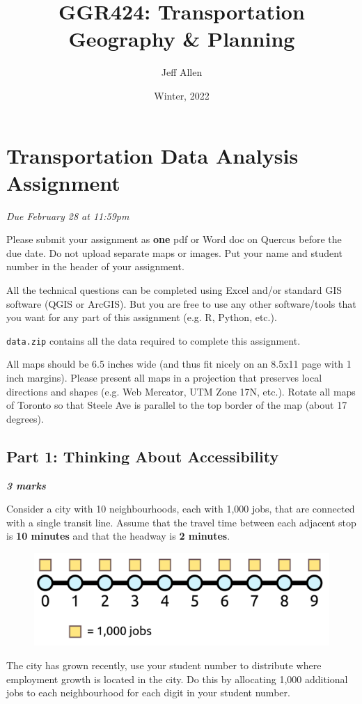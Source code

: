 \documentclass[11pt]{article}
\title{\textbf{GGR424: Transportation Geography \& Planning}}
\author{Jeff Allen}
\date{Winter, 2022}
\begin{document}
	\allsectionsfont{\sffamily}
	
	\section*{Transportation Data Analysis Assignment} 
		
	\textit{Due February 28 at 11:59pm}
	
	Please submit your assignment as \textbf{one} pdf or Word doc on Quercus before the due date. Do not upload separate maps or images. Put your name and student number in the header of your assignment.
	
	All the technical questions can be completed using Excel and/or standard GIS software (QGIS or ArcGIS). But you are free to use any other software/tools that you want for any part of this assignment (e.g. R, Python, etc.).
	
	\texttt{data.zip} contains all the data required to complete this assignment.
	
	All maps should be 6.5 inches wide (and thus fit nicely on an 8.5x11 page with 1 inch margins). Please present all maps in a projection that preserves local directions and shapes (e.g. Web Mercator, UTM Zone 17N, etc.). Rotate all maps of Toronto so that Steele Ave is parallel to the top border of the map (about 17 degrees).
	
		
	\subsection*{Part 1: Thinking About Accessibility} 
	
	\vspace{-2mm}
	\textbf{\textit{3 marks}}
	
	Consider a city with 10 neighbourhoods, each with 1,000 jobs, that are connected with a single transit line. Assume that the travel time between each adjacent stop is \textbf{10 minutes} and that the headway is \textbf{2 minutes}. 
	
	\begin{figure}[h]
		\centering
		\includegraphics[width=0.5\linewidth]{images/city_plain.png}
	\end{figure}

	The city has grown recently, use your student number to distribute where employment growth is located in the city. Do this by allocating 1,000 additional jobs to each neighbourhood for each digit in your student number.
	
\end{document}
